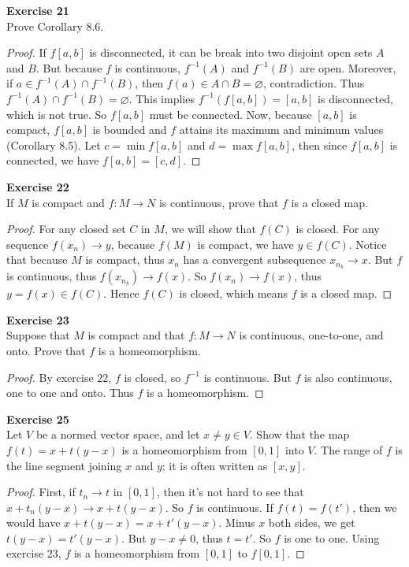 \documentclass[12pt, a4paper]{article}
\theoremstyle{plain}
\newenvironment{exercise}[2][Exercise]
    { \begin{mdframed}[backgroundcolor=gray!20] \textbf{#1 #2} \\}
    {  \end{mdframed}}
\begin{document}
\begin{exercise}{21}
Prove Corollary 8.6.
\end{exercise}
	\begin{proof}
	If $f[a,b]$ is disconnected, it can be break into two disjoint open sets $A$ and $B$. But because $f$ is continuous, $f^{-1}(A)$ and $f^{-1}(B)$ are open. Moreover, if $a\in f^{-1}(A)\cap f^{-1}(B)$, then $f(a)\in A\cap B=\varnothing$, contradiction. Thus $f^{-1}(A)\cap f^{-1}(B)=\varnothing$. This implies $f^{-1}(f[a,b])=[a,b]$ is disconnected, which is not true. So $f[a,b]$ must be connected. Now, because $[a,b]$ is compact, $f[a,b]$ is bounded and $f$ attains its maximum and minimum values (Corollary 8.5). Let $c=\min f[a,b]$ and $d=\max f[a,b]$, then since $f[a,b]$ is connected, we have $f[a,b]=[c,d]$.
	\end{proof}
	
\begin{exercise}{22}
If $M$ is compact and $f:M\rightarrow N$ is continuous, prove that $f$ is a closed map.
\end{exercise}
	\begin{proof}
	For any closed set $C$ in $M$, we will show that $f(C)$ is closed. For any sequence $f(x_n)\rightarrow y$, because $f(M)$ is compact, we have $y\in f(C)$. Notice that because $M$ is compact, thus $x_n$ has a convergent subsequence $x_{n_k}\rightarrow x$. But $f$ is continuous, thus $f(x_{n_k})\rightarrow f(x)$. So $f(x_n)\rightarrow f(x)$, thus $y=f(x)\in f(C)$. Hence $f(C)$ is closed, which means $f$ is a closed map.
	\end{proof}

\pagebreak

\begin{exercise}{23}
Suppose that $M$ is compact and that $f:M\rightarrow N$ is continuous, one-to-one, and onto. Prove that $f$ is a homeomorphism.
\end{exercise}
	\begin{proof}
	By exercise 22, $f$ is closed, so $f^{-1}$ is continuous. But $f$ is also continuous, one to one and onto. Thus $f$ is a homeomorphism.
	\end{proof}
	
\begin{exercise}{25}
Let $V$ be a normed vector space, and let $x\neq y\in V$. Show that the map $f(t)=x+t(y-x)$ is a homeomorphism from $[0,1]$ into $V$. The range of $f$ is the line segment joining $x$ and $y$; it is often written as $[x,y]$.
\end{exercise}
	\begin{proof}
	First, if $t_n\rightarrow t$ in $[0,1]$, then it's not hard to see that $x+t_n(y-x)\rightarrow x+t(y-x)$. So $f$ is continuous. If $f(t)=f(t')$, then we would have  $x+t(y-x)=x+t'(y-x)$. Minus $x$ both sides, we get $t(y-x)=t'(y-x)$. But $y-x\neq 0$, thus $t=t'$. So $f$ is one to one. Using exercise 23, $f$ is a homeomorphism from $[0,1]$ to $f[0,1]$.
	\end{proof}
	
\end{document}
